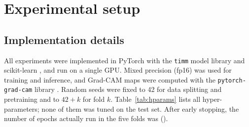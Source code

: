 \section{Experimental setup}\label{sec:setup}
\subsection{Implementation details}
All experiments were implemented in PyTorch \citep{paszke2019pytorch} with the \texttt{timm} model library
\citep{wightman2019timm} and scikit-learn \citep{pedregosa2011scikit}, and run on a single  GPU. Mixed
precision (fp16) \citep{micikevicius2018mixed} was used for training and inference, and Grad-CAM maps were computed
with the \texttt{pytorch-grad-cam} library \citep{gildenblat2021gradcam}. Random seeds were fixed to 42 for
data splitting and pretraining and to $42+k$ for fold $k$. Table~\ref{tab:hparams} lists all hyper-parameters; none of
them was tuned on the test set. After early stopping, the number of epochs actually run in the five folds was
().

